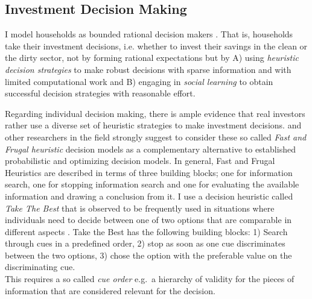 \subsection{Investment Decision Making}
\label{sec:investment_decision_making}
I model households as bounded rational decision makers \citep{simon1972theories, simon1982models, gigerenzer2002bounded}.
That is, households take their investment decisions, i.e. whether to invest their savings in the clean or the dirty sector, not by forming rational expectations \citep{Evans2006, Kirman2014} but by A) using \emph{heuristic decision strategies} to make robust decisions with sparse information and with limited computational work and B) engaging in \emph{social learning} \citep{Bandura1971} to obtain successful decision strategies \citep{Traulsen2010} with reasonable effort.

Regarding individual decision making, there is ample evidence that real investors rather use a diverse set of heuristic strategies to make investment decisions. \cite{Gigerenzer2018} and other researchers in the field strongly suggest to consider these so called \emph{Fast and Frugal heuristic} decision models as a complementary alternative to established probabilistic and optimizing decision models. 
In general, Fast and Frugal Heuristics are described in terms of three building blocks; one for information search, one for stopping information search and one for evaluating the available information and drawing a conclusion from it.
I use a decision heuristic called \emph{Take The Best} that is observed to be frequently used in situations where individuals need to decide between one of two options that are comparable in different aspects \citep{gigerenzer1999simple, Newell2003a}. 
Take the Best has the following building blocks: 1) Search through cues in a predefined order, 2) stop as soon as one cue discriminates between the two options, 3) chose the option with the preferable value on the discriminating cue. \\
This requires a so called \textit{cue order} e.g.\ a hierarchy of validity for the pieces of information that are considered relevant for the decision. \\


